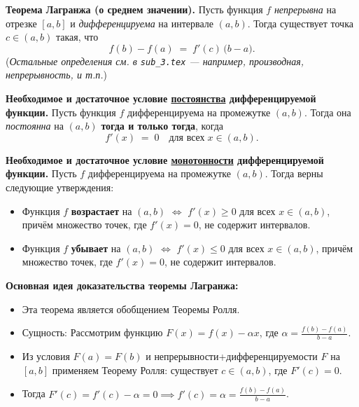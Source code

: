 

\textbf{Теорема Лагранжа (о среднем значении).}
Пусть функция $f$ \emph{непрерывна} на отрезке $[a,b]$ и \emph{дифференцируема} на интервале $(a,b)$. Тогда существует точка $c \in (a,b)$ такая, что
\[
f(b) - f(a) \;=\; f'(c)\,\bigl(b - a\bigr).
\]
(\emph{Остальные определения см. в \texttt{sub\_3.tex} — например, производная, непрерывность, и т.п.})

\medskip

\textbf{Необходимое и достаточное условие \underline{постоянства} дифференцируемой функции.}
Пусть функция $f$ дифференцируема на промежутке $(a,b)$. Тогда она \emph{постоянна} на $(a,b)$ \textbf{тогда и только тогда}, когда
\[
f'(x) \;=\; 0 \quad\text{для всех}\; x \in (a,b).
\]

\medskip

\textbf{Необходимое и достаточное условие \underline{монотонности} дифференцируемой функции.}
Пусть $f$ дифференцируема на промежутке $(a,b)$. Тогда верны следующие утверждения:

\begin{itemize}
  \item Функция $f$ \textbf{возрастает} на $(a,b)$ \(\Longleftrightarrow\) \(f'(x)\ge 0\) для всех \(x\in(a,b)\), причём множество точек, где \(f'(x)=0\), не содержит интервалов.
  \item Функция $f$ \textbf{убывает} на $(a,b)$ \(\Longleftrightarrow\) \(f'(x)\le 0\) для всех \(x\in(a,b)\), причём множество точек, где \(f'(x)=0\), не содержит интервалов.
\end{itemize}

\medskip


\textbf{Основная идея доказательства теоремы Лагранжа:}
\begin{itemize}
  \item Эта теорема является обобщением Теоремы Ролля.
  \item Сущность: Рассмотрим функцию $F(x)= f(x) - \alpha x$, где \(\alpha = \frac{f(b)-f(a)}{b-a}\).  
  \item Из условия $F(a)=F(b)$ и непрерывности+дифференцируемости $F$ на $[a,b]$ применяем Теорему Ролля: существует $c \in(a,b)$, где $F'(c)=0$.  
  \item Тогда $F'(c)=f'(c)-\alpha=0\implies f'(c)=\alpha = \frac{f(b)-f(a)}{b-a}$.  
\end{itemize}

